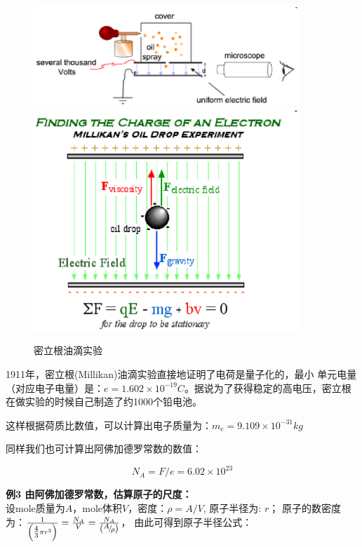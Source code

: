 \begin{figure}[htbp]
\begin{center}
\includegraphics[width=10cm]{AtomIdea/millikan.ps}
\includegraphics[width=10cm]{AtomIdea/millikan1.ps}
\caption{密立根油滴实验}
\end{center}
\end{figure}


1911年，密立根(Millikan)油滴实验直接地证明了电荷是量子化的，最小
单元电量（对应电子电量）是：$e = 1.602 \times 10^{ - 19} C$。据说为了获得稳定的高电压，密立根在做实验的时候自己制造了约1000个铅电池。


这样根据荷质比数值，可以计算出电子质量为：$m_e  = 9.109 \times 10^{
- 31} kg$

同样我们也可计算出阿佛加德罗常数的数值：

\begin{equation}
N_A  = F/e = 6.02 \times 10^{23} 
\end{equation}


{\bf 例3 由阿佛加德罗常数，估算原子的尺度：}\\
设mole质量为$A$，mole体积$V$，密度：$\rho  = A/V$, 原子半径为: $r$；
原子的数密度为：$\frac{1}{{\left( {{\textstyle{4 \over 3}}\pi r^3 }
\right)}} = \frac{{N_A }}{V} = \frac{{N_A }}{{\left(
{{\raise0.5ex\hbox{$\scriptstyle A$} \kern-0.1em/\kern-0.15em
\lower0.25ex\hbox{$\scriptstyle \rho $}}} \right)}}$，
由此可得到原子半径公式：


